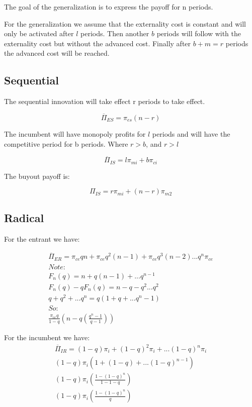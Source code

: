 \documentclass[11pt]{article}
\begin{document}
The goal of the generalization is to express the payoff for n periods. 

For the generalization we assume that the externality cost is constant and will only be activated after $l$ periods. Then another $b$ periods will follow with the externality cost but without the advanced cost. Finally after $b+m=r$ periods the advanced cost will be reached. 

\subsection{Sequential}

The sequential innovation will take effect r periods to take effect.

\begin{equation*}
\overline{\Pi}_{ES} = \pi_{es}(n-r)
\end{equation*}

The incumbent will have monopoly profits for $l$ periods and will have the competitive period for b periods. Where $r>b$, and $r>l$

\begin{equation*}
\overline{\Pi}_{IS}= l \pi_{mi}+ b \pi_{ci}
\end{equation*}

The buyout payoff is:

\begin{equation*}
\Pi_{IS} = r \pi_{mi} + (n-r) \pi_{m2}
\end{equation*}


\subsection{Radical}

For the entrant we have:

\begin{align*}
\overline{\Pi}_{ER} = \pi_{ce}qn+\pi_{ce}q^2(n-1)+\pi_{ce}q^3(n-2)...q^n\pi_{ce} \\
Note: \\
F_n(q)=n+q(n-1)+...q^{n-1} \\
F_n(q)-qF_n(q)=n-q-q^2...q^2 \\
q+q^2+...q^n = q(1+q+...q^n-1) \\
So: \\
\frac{\pi_{ce} q}{1-q} \left(n-q (\frac{q^n-1}{q-1}) \right)
\end{align*}

For the incumbent we have: 
\begin{align*}
\overline{\Pi}_{IR} =(1-q) \pi_i + (1-q)^2 \pi_i +...(1-q)^n \pi_i \\
(1-q)\pi_i(1+(1-q)+...(1-q)^{n-1}) \\
(1-q)\pi_i \left(\frac{1-(1-q)^{n}}{1-{1-q}} \right) \\
(1-q)\pi_i \left(\frac{1-(1-q)^{n}}{q} \right)
\end{align*}
\end{document}
